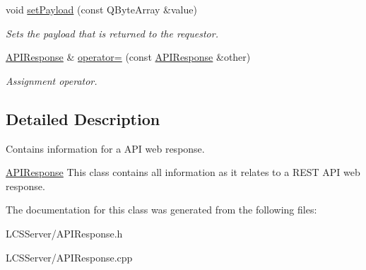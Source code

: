 \begin{DoxyCompactItemize}
void \hyperlink{class_a_p_i_response_a7b36f0565b798ad4740f83b58488f079}{set\+Payload} (const Q\+Byte\+Array \&value)
\begin{DoxyCompactList}\small\item\em Sets the payload that is returned to the requestor. \end{DoxyCompactList}\item 
\mbox{\label{class_a_p_i_response_a6c757d09db4b79b845b4ecc699c87905}} 
\hyperlink{class_a_p_i_response}{A\+P\+I\+Response} \& \hyperlink{class_a_p_i_response_a6c757d09db4b79b845b4ecc699c87905}{operator=} (const \hyperlink{class_a_p_i_response}{A\+P\+I\+Response} \&other)
\begin{DoxyCompactList}\small\item\em Assignment operator. \end{DoxyCompactList}\end{DoxyCompactItemize}


\subsection{Detailed Description}
Contains information for a A\+PI web response. 

\hyperlink{class_a_p_i_response}{A\+P\+I\+Response} This class contains all information as it relates to a R\+E\+ST A\+PI web response. 

The documentation for this class was generated from the following files\+:\begin{DoxyCompactItemize}
\item 
L\+C\+S\+Server/A\+P\+I\+Response.\+h\item 
L\+C\+S\+Server/A\+P\+I\+Response.\+cpp\end{DoxyCompactItemize}
